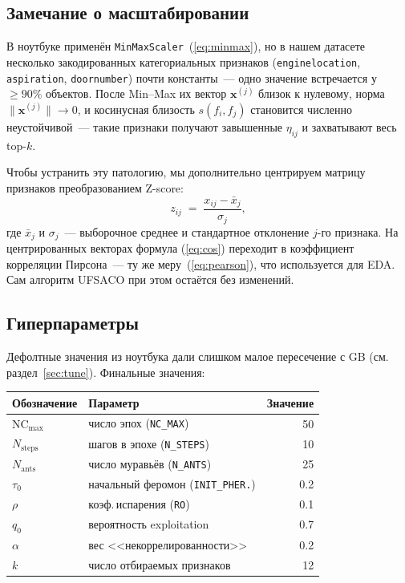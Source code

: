 \documentclass[12pt,a4paper]{article}
\begin{document}
\subsection{Замечание о масштабировании}
В ноутбуке применён \texttt{MinMaxScaler}~(\ref{eq:minmax}), но в нашем
датасете несколько закодированных категориальных признаков
(\texttt{enginelocation}, \texttt{aspiration}, \texttt{doornumber})
почти константы~--- одно значение встречается у $\geq 90\%$ объектов.
После Min--Max их вектор $\mathbf{x}^{(j)}$ близок к нулевому,
норма $\|\mathbf{x}^{(j)}\| \to 0$, и косинусная близость
$s(f_i,f_j)$ становится численно неустойчивой~--- такие признаки
получают завышенные $\eta_{ij}$ и захватывают весь top-$k$.

Чтобы устранить эту патологию, мы дополнительно центрируем матрицу
признаков преобразованием Z-score:
\begin{equation}
  z_{ij} \;=\; \frac{x_{ij} - \bar{x}_j}{\sigma_j},
  \label{eq:zscore}
\end{equation}
где $\bar{x}_j$ и $\sigma_j$~--- выборочное среднее и стандартное
отклонение $j$-го признака. На центрированных векторах формула
(\ref{eq:cos}) переходит в коэффициент корреляции Пирсона~--- ту же
меру~(\ref{eq:pearson}), что используется для EDA. Сам алгоритм UFSACO
при этом остаётся без изменений.

\subsection{Гиперпараметры}\label{sec:hp}
Дефолтные значения из ноутбука дали слишком малое пересечение с GB
(см. раздел~\ref{sec:tune}). Финальные значения:

\begin{center}
\begin{tabular}{ll r}
\toprule
Обозначение & Параметр & Значение \\
\midrule
$\text{NC}_{\max}$        & число эпох (\texttt{NC\_MAX})            & 50   \\
$N_{\text{steps}}$        & шагов в эпохе (\texttt{N\_STEPS})        & 10   \\
$N_{\text{ants}}$         & число муравьёв (\texttt{N\_ANTS})        & 25   \\
$\tau_0$                  & начальный феромон (\texttt{INIT\_PHER.}) & 0.2  \\
$\rho$                    & коэф.\,испарения (\texttt{RO})           & 0.1  \\
$q_0$                     & вероятность exploitation                 & 0.7  \\
$\alpha$                  & вес <<некоррелированности>>              & 0.2  \\
$k$                       & число отбираемых признаков               & 12   \\
\bottomrule
\end{tabular}
\end{center}
\end{document}
